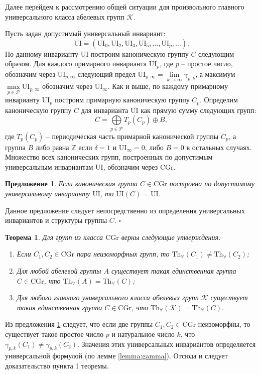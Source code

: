\documentclass[a4paper,11pt,twoside]{article}
\newtheorem{theorem}{Теорема}[section]
\newtheorem{proposition}{Предложение}[section]
\def\proof{{\noindent{\bf Доказательство.}} }
\def\K{{\mathcal{K}}}
\def\P{{\mathcal{P}}}
\def\Z{{\mathbb{Z}}}
\def\Tha{{\mathrm{Th}_\forall}}
\def\CG{{\mathrm{CGr}}}
\def\ui{{\mathrm{UI}}}
\begin{document}
Далее перейдем к рассмотрению общей ситуации для произвольного главного универсального класса абелевых групп $\K$.

Пусть задан допустимый универсальный инвариант:
$$\ui = (\ui_0, \ui_2, \ui_3, \ui_5, \ldots, \ui_p, \ldots).$$ 
По данному инварианту $\ui$ построим каноническую группу $C$ следующим образом. Для каждого примарного инварианта $\ui_p$, где $p$ -- простое число, обозначим через $\ui_{p,\infty}$ следующий предел $\ui_{p,\infty} = \lim\limits_{k \rightarrow \infty} \gamma_{p,k}$, а максимум $\max\limits_{p \in \P} \ui_{p, \infty}$ обозначим через $\ui_\infty$. Как и выше, по каждому примарному инварианту $\ui_p$ построим примарную каноническую группу $C_p$. Определим каноническую группу $C$ для инварианта $\ui$ как прямую сумму следующих групп:
$$C = \bigoplus\limits_{p \in \P} T_p(C_p) \oplus B,$$
где $T_p(C_p)$ -- периодическая часть примарной канонической группы $C_p$, а группа $B$ либо равна $\Z$ если $\delta = 1$ и $\ui_\infty = 0$, либо $B = 0$ в остальных случаях. Множество всех канонических групп, построенных по допустимым универсальным инвариантам $\ui$, обозначим через $\CG$.

\begin{proposition}\label{prop:UnivEnvForCannonicalGroup2}
Если каноническая группа $C \in \CG$ построена по допустимому универсальному инварианту $\ui$, то $\ui(C) = \ui$.
\end{proposition}
\proof Данное предложение следует непосредственно из определения универсальных инвариантов и структуры группы $C$. $\square$


\begin{theorem}\label{th:CannonicalGroupsAll}
Для групп из класса $\CG$ верны следующие утверждения:
\begin{enumerate}
\item Если $C_1, C_2 \in \CG$ пара неизоморфных групп, то $\Tha(C_1) \neq \Tha(C_2)$;
\item Для любой абелевой группы $A$ существует такая единственная группа $C \in \CG$, что $\Tha(A) = \Tha(C)$;
\item Для любого главного универсального класса абелевых групп $\K$ существует такая единственная группа $C \in \CG$, что $\Tha(\K) = \Tha(C).$
\end{enumerate}
\end{theorem}

\proof Из предложения \ref{prop:UnivEnvForCannonicalGroup2} следует, что если две группы $C_1, C_2 \in \CG$ неизоморфны, то существует такое простое число $p$ и натуральное число $k$, что $\gamma_{p,k}(C_1) \neq \gamma_{p,k}(C_2)$. Значения этих универсальных инвариантов определяется универсальной формулой (по лемме \ref{lemma:gamma}). Отсюда и следует доказательство пункта 1 теоремы.
\end{document}
